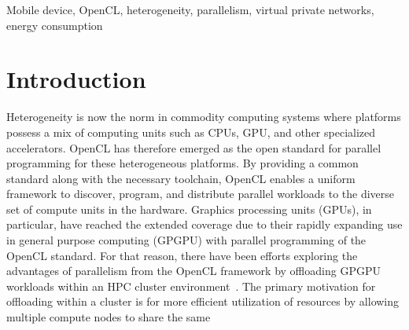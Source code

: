 \documentclass[10pt, conference, compsocconf]{IEEEtran}
\begin{document}
\begin{IEEEkeywords}
Mobile device, OpenCL, heterogeneity, parallelism, virtual private
networks, energy consumption
\end{IEEEkeywords}

\section{Introduction}
%
Heterogeneity is now the norm in commodity computing systems where
platforms possess a mix of computing units such as CPUs, GPU, and other
specialized accelerators.
%
OpenCL has therefore emerged as the open standard for parallel programming
for these heterogeneous platforms.
%
By providing a common standard along with the necessary toolchain, OpenCL
enables a uniform framework to discover, program, and distribute parallel
workloads to the diverse set of compute units in the hardware.
%
Graphics processing units (GPUs), in particular, have reached the extended
coverage due to their rapidly expanding use in general purpose computing
(GPGPU) with parallel programming of the OpenCL standard.
%
%
%
%
%
%
For that reason, there have been efforts exploring the advantages of
parallelism from the OpenCL framework by offloading GPGPU workloads
within an HPC cluster environment~\cite{rcuda,vocl}.
%
The primary motivation for offloading within a cluster is for more efficient
utilization of resources by allowing multiple compute nodes to share the same
\end{document}
